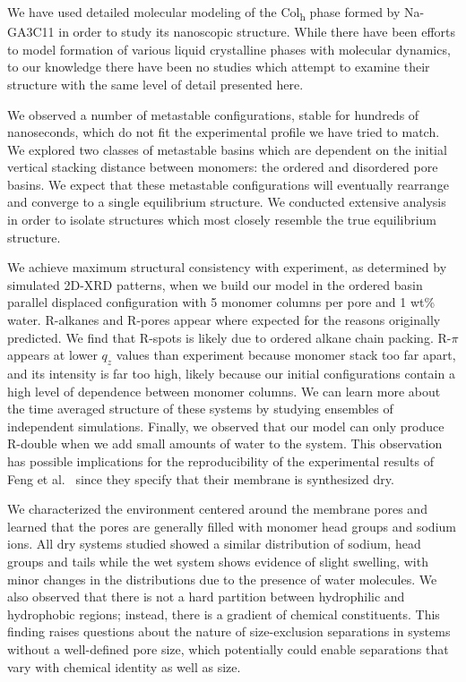 \documentclass[journal=jpcbfk,manuscript=article]{achemso}
\begin{document}
  We have used detailed molecular modeling of the Col\textsubscript{h} phase
  formed by Na-GA3C11 in order to study its nanoscopic structure. While there
  have been efforts to model formation of various liquid crystalline phases with
  molecular dynamics, to our knowledge there have been no studies which attempt
  to examine their structure with the same level of detail presented here.
  
  We observed a number of metastable configurations, stable for hundreds of 
  nanoseconds, which do not fit the experimental profile we have tried to match. 
  We explored two classes of metastable basins which are dependent on the initial
  vertical stacking distance between monomers: the ordered and disordered pore basins.
  We expect that these metastable configurations will eventually rearrange and converge
  to a single equilibrium structure. We conducted extensive analysis in order to 
  isolate structures which most closely resemble the true equilibrium structure.

  We achieve maximum structural consistency with experiment, as determined by
  simulated 2D-XRD patterns, when we build our model in the ordered basin
  parallel displaced configuration with 5 monomer columns per pore and 1 wt\%
  water. R-alkanes and R-pores appear where expected for the reasons originally
  predicted. We find that R-spots is likely due to ordered alkane chain packing.
  R-$\pi$ appears at lower $q_z$ values than experiment because monomer stack too far
  apart, and its intensity is far too high, likely because our initial
  configurations contain a high level of dependence between monomer columns.
  We can learn more about the time averaged structure of these systems by studying
  ensembles of independent simulations. Finally, we observed that our model can 
  only produce R-double when we add small amounts of water to the system. This 
  observation has possible implications for the reproducibility of the experimental
  results of Feng et al.~\cite{feng_scalable_2014,feng_thin_2016} since they
  specify that their membrane is synthesized dry.  

  We characterized the environment centered around the membrane pores and
  learned that the pores are generally filled with monomer head groups and sodium
  ions. All dry systems studied showed a similar distribution of sodium, head
  groups and tails while the wet system shows evidence of slight swelling, with
  minor changes in the distributions due to the presence of water molecules. We
  also observed that there is not a hard partition between hydrophilic and
  hydrophobic regions; instead, there is a gradient of chemical constituents. This finding raises
  questions about the nature of size-exclusion separations in systems without a
  well-defined pore size, which potentially could enable separations that
  vary with chemical identity as well as size. 
\end{document}
